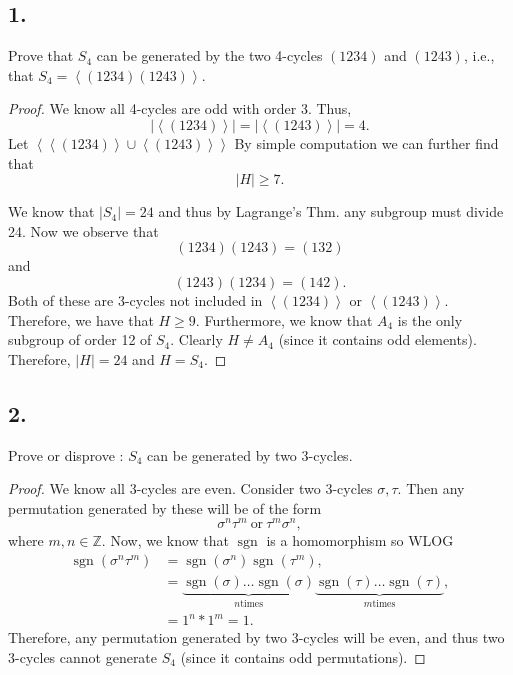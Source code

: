 \documentclass{article}
\newcommand{\Z}{\mathbb{Z}}
\newcommand{\gen}[1]{\left\langle #1 \right\rangle}
\DeclareMathOperator*{\sgn}{sgn}
\newenvironment{hwproof}[1]
{
    #1
    \begin{proof}
}{
    \end{proof}
}
\begin{document}
\subsection*{1.}
\begin{hwproof}
    {
        Prove that $S_4$ can be generated by the two 4-cycles $(1234)$ and $(1243)$,
        i.e., that $S_4 = \gen{(1234)(1243)}$.
    }
    We know all 4-cycles are odd with order 3. Thus,
    \begin{equation*}
        |\gen{(1 2 3 4)}| = |\gen{(1 2 4 3)}| = 4.
    \end{equation*}
    Let $\gen{\gen{(1234)} \cup \gen{(1243)}}$
    By simple computation we can further find that
    \begin{equation*}
        |H| \geq 7.
    \end{equation*}

    We know that $|S_4| = 24$ and thus by Lagrange's Thm. any subgroup must
    divide 24. Now we observe that
    \begin{equation*}
        (1234)(1243) = (132)
    \end{equation*}
    and
    \begin{equation*}
        (1243)(1234) = (142).
    \end{equation*}
    Both of these are 3-cycles not included in $\gen{(1234)}$ or
    $\gen{(1243)}$. Therefore, we have that $H\geq 9$. Furthermore, we know that
    $A_4$ is the only subgroup of order 12 of $S_4$. Clearly $H\neq A_4$
    (since it contains odd elements). Therefore, $|H| = 24$ and $H = S_4$.
\end{hwproof}

\subsection*{2.}
\begin{hwproof}
    {
        Prove or disprove : $S_4$ can be generated by two 3-cycles.
    }
    We know all 3-cycles are even.
    Consider two 3-cycles $\sigma, \tau$. Then any permutation generated by these
    will be of the form
    \begin{equation*}
        \sigma^n\tau^m \ \text{or} \ \tau^m\sigma^n,
    \end{equation*}
    where $m,n \in \Z$. Now, we know that $\sgn$ is a homomorphism so WLOG
    \begin{align*}
        \sgn(\sigma^n\tau^m) & = \sgn(\sigma^n)\sgn(\tau^m),                                                                                         \\
                             & = \underbrace{\sgn(\sigma)\dots\sgn(\sigma)}_{n \text{times}}\underbrace{\sgn(\tau)\dots\sgn(\tau)}_{m \text{times}}, \\
                             & = 1^n*1^m = 1.
    \end{align*}
    Therefore, any permutation generated by two 3-cycles will be even, and thus
    two 3-cycles cannot generate $S_4$ (since it contains odd permutations).

\end{hwproof}
\end{document}
